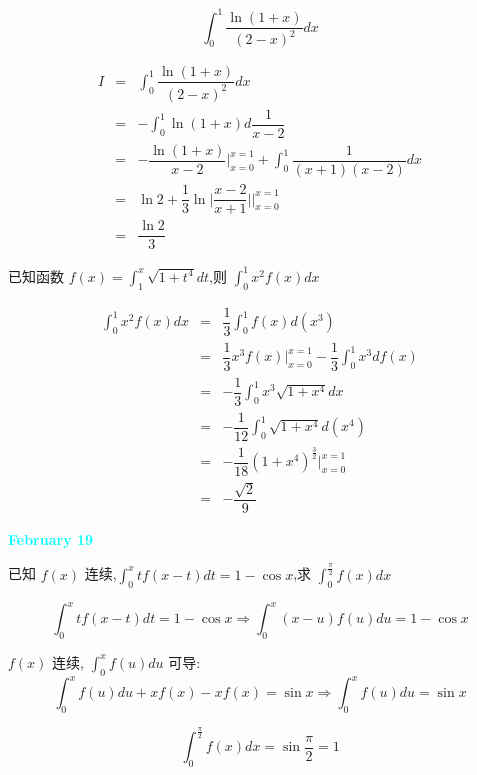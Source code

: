 \begin{example}[][Exam: 28.3.6]
	$$\int_{0}^{1}\dfrac{\ln(1+x)}{(2-x)^{2}}dx$$
\end{example}
\begin{solution}
	\begin{eqnarray*}
		I & = & \int_{0}^{1}\dfrac{\ln(1+x)}{(2-x)^{2}}dx\\
		  & = & -\int_{0}^{1}\ln(1+x)d \dfrac{1}{x-2}\\
		  & = & -\dfrac{\ln(1+x)}{x-2}\big|_{x=0}^{x=1} + \int_{0}^{1}\dfrac{1}{(x+1)(x-2)}dx\\
		  & = & \ln 2 + \dfrac{1}{3}\ln\big|\dfrac{x-2}{x+1}\big|\big|_{x=0}^{x=1}\\
		  & = & \dfrac{\ln 2}{3}
	\end{eqnarray*}
\end{solution}
\begin{example}[][Exam: 28.3.7]
	已知函数 $f(x)=\int_{1}^{x}\sqrt{1+t^{4}}dt$,则 $\int_{0}^{1}x^{2}f(x)dx$
\end{example}
\begin{solution}
	\begin{eqnarray*}
		\int_{0}^{1}x^{2}f(x)dx & = & \dfrac{1}{3}\int_{0}^{1}f(x)d(x^{3})\\
		& = & \dfrac{1}{3}x^{3}f(x)\big|_{x=0}^{x=1} - \dfrac{1}{3}\int_{0}^{1}x^{3}df(x)\\
		& = & -\dfrac{1}{3}\int_{0}^{1}x^{3}\sqrt{1+x^{4}}dx\\
		& = & -\dfrac{1}{12}\int_{0}^{1}\sqrt{1+x^{4}}d(x^{4})\\
		& = & -\dfrac{1}{18}(1+x^{4})^{\frac{3}{2}}\big|_{x=0}^{x=1}\\
		& = & -\dfrac{\sqrt{2}}{9} 
	\end{eqnarray*}
\end{solution}

\textcolor{cyan}{\textbf{February 19}}

\begin{example}[][Exam: 28.3.8]
	已知 $f(x)$ 连续,$\int_{0}^{x}tf(x-t)dt=1-\cos x$,求 $\int_{0}^{\frac{\pi}{2}}f(x)dx$
\end{example}
\begin{solution}
	$$\int_{0}^{x}tf(x-t)dt = 1 - \cos x\Rightarrow \int_{0}^{x}(x-u)f(u)du = 1 - \cos x$$

	$f(x)$ 连续, $\int_{0}^{x}f(u)du$ 可导:
	$$\int_{0}^{x}f(u)du + xf(x) - xf(x) = \sin x\Rightarrow \int_{0}^{x}f(u)du = \sin x$$

	$$\int_{0}^{\frac{\pi}{2}}f(x)dx = \sin \dfrac{\pi}{2} = 1$$

\end{solution}

